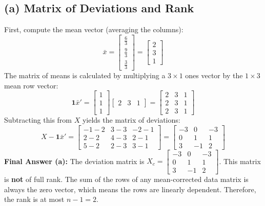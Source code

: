 \documentclass[12pt]{article}
\begin{document}
\subsection*{(a) Matrix of Deviations and Rank}
First, compute the mean vector (averaging the columns):
$$ \bar{x} = \begin{bmatrix} \frac{6}{3} \\ \frac{9}{3} \\ \frac{3}{3} \end{bmatrix} = \begin{bmatrix} 2 \\ 3 \\ 1 \end{bmatrix} $$
The matrix of means is calculated by multiplying a $3 \times 1$ ones vector by the $1 \times 3$ mean row vector:
$$ \mathbf{1}\bar{x}' = \begin{bmatrix} 1 \\ 1 \\ 1 \end{bmatrix} \begin{bmatrix} 2 & 3 & 1 \end{bmatrix} = \begin{bmatrix} 2 & 3 & 1 \\ 2 & 3 & 1 \\ 2 & 3 & 1 \end{bmatrix} $$
Subtracting this from $X$ yields the matrix of deviations:
$$ X - \mathbf{1}\bar{x}' = \begin{bmatrix} -1-2 & 3-3 & -2-1 \\ 2-2 & 4-3 & 2-1 \\ 5-2 & 2-3 & 3-1 \end{bmatrix} = \begin{bmatrix} -3 & 0 & -3 \\ 0 & 1 & 1 \\ 3 & -1 & 2 \end{bmatrix} $$
\textbf{Final Answer (a):} The deviation matrix is $X_c = \begin{bmatrix} -3 & 0 & -3 \\ 0 & 1 & 1 \\ 3 & -1 & 2 \end{bmatrix}$. This matrix is \textbf{not} of full rank. The sum of the rows of any mean-corrected data matrix is always the zero vector, which means the rows are linearly dependent. Therefore, the rank is at most $n-1 = 2$.
\end{document}
